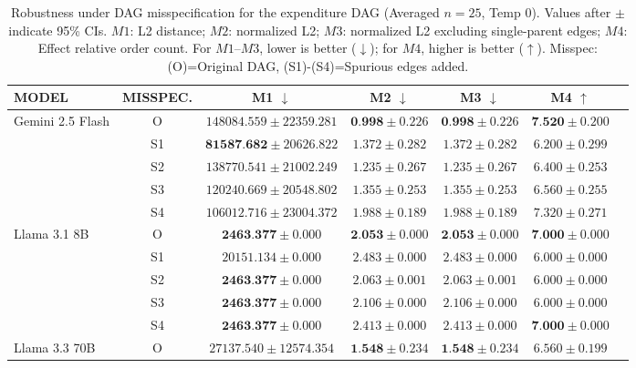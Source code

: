 
\begin{table}[t]
\caption{Robustness under DAG misspecification for the expenditure DAG (Averaged $n=25$, Temp 0). Values after $\pm$ indicate 95\% CIs. $M1$: L2 distance; $M2$: normalized L2; $M3$: normalized L2 excluding single-parent edges; $M4$: Effect relative order count. For $M1$--$M3$, lower is better ($\downarrow$); for $M4$, higher is better ($\uparrow$). Misspec: (O)=Original DAG, (S1)-(S4)=Spurious edges added.}
\label{tab:dag_misspecification_robustness_results}
\begin{center}
\footnotesize
\setlength{\tabcolsep}{3pt}
\begin{tabular}{lcccccc}
\toprule
	\textbf{MODEL} & \textbf{MISSPEC.} & \textbf{M1} $\downarrow$ & \textbf{M2} $\downarrow$ & \textbf{M3} $\downarrow$ & \textbf{M4} $\uparrow$ \\
\midrule
Gemini 2.5 Flash & O & $148084.559 \pm 22359.281$ & $\textbf{0.998} \pm 0.226$ & $\textbf{0.998} \pm 0.226$ & $\textbf{7.520} \pm 0.200$ \\
                 & S1 & $\textbf{81587.682} \pm 20626.822$ & $1.372 \pm 0.282$ & $1.372 \pm 0.282$ & $6.200 \pm 0.299$ \\
                 & S2 & $138770.541 \pm 21002.249$ & $1.235 \pm 0.267$ & $1.235 \pm 0.267$ & $6.400 \pm 0.253$ \\
                 & S3 & $120240.669 \pm 20548.802$ & $1.355 \pm 0.253$ & $1.355 \pm 0.253$ & $6.560 \pm 0.255$ \\
                 & S4 & $106012.716 \pm 23004.372$ & $1.988 \pm 0.189$ & $1.988 \pm 0.189$ & $7.320 \pm 0.271$ \\
\addlinespace
Llama 3.1 8B     & O & $\textbf{2463.377} \pm 0.000$ & $\textbf{2.053} \pm 0.000$ & $\textbf{2.053} \pm 0.000$ & $\textbf{7.000} \pm 0.000$ \\
                 & S1 & $20151.134 \pm 0.000$ & $2.483 \pm 0.000$ & $2.483 \pm 0.000$ & $6.000 \pm 0.000$ \\
                 & S2 & $\textbf{2463.377} \pm 0.000$ & $2.063 \pm 0.001$ & $2.063 \pm 0.001$ & $6.000 \pm 0.000$ \\
                 & S3 & $\textbf{2463.377} \pm 0.000$ & $2.106 \pm 0.000$ & $2.106 \pm 0.000$ & $6.000 \pm 0.000$ \\
                 & S4 & $\textbf{2463.377} \pm 0.000$ & $2.413 \pm 0.000$ & $2.413 \pm 0.000$ & $\textbf{7.000} \pm 0.000$ \\
\addlinespace
Llama 3.3 70B    & O & $27137.540 \pm 12574.354$ & $\textbf{1.548} \pm 0.234$ & $\textbf{1.548} \pm 0.234$ & $6.560 \pm 0.199$ \\

\end{tabular}
\end{center}
\end{table}
